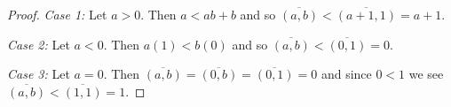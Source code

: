 \documentclass{article}
\begin{document}
\begin{flushleft}
\begin{proof}
\textsl{Case 1:} Let $a>0$. Then $a<ab+b$ and so $\overline{(a,b)} < \overline{(a+1,1)} = a+1$.\newline

\textsl{Case 2:} Let $a<0$. Then $a(1)<b(0)$ and so $\overline{(a,b)} < \overline{(0,1)} = 0$.\newline

\textsl{Case 3:} Let $a=0$. Then $\overline{(a,b)}=\overline{(0,b)}=\overline{(0,1)}=0$ and since $0<1$ we see $\overline{(a,b)} < \overline{(1,1)} = 1$.
\end{proof}





\end{flushleft}
\end{document}
